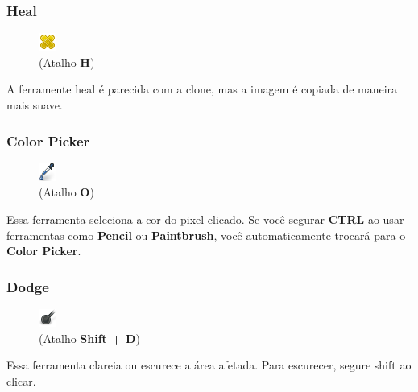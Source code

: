 \documentclass[12pt,onecolumn]{article}
\begin{document}
    \subsubsection{Heal}
      \begin{figure}
        \vspace{-40pt}
        \begin{center}
          \includegraphics{gimp-icons/stock-tool-heal-22.png} \\
          (Atalho {\bf H})
        \end{center}
        \label{fig:heal}
        \vspace{-20pt}
      \end{figure}
      A ferramente heal é parecida com a clone, mas a imagem é copiada de maneira mais suave.

    \subsubsection{Color Picker}
      \begin{figure}
        \vspace{-20pt}
        \begin{center}
          \includegraphics{gimp-icons/stock-tool-color-picker-22.png} \\
          (Atalho {\bf O})
        \end{center}
        \label{fig:color-picker}
        \vspace{-20pt}
      \end{figure}
      Essa ferramenta seleciona a cor do pixel clicado. Se você segurar {\bf
      CTRL} ao usar ferramentas como {\bf Pencil} ou {\bf Paintbrush}, você
      automaticamente trocará para o {\bf Color Picker}.
      
    \clearpage
    \subsubsection{Dodge}
    \begin{figure}
      \vspace{-40pt}
      \begin{center}
        \includegraphics{gimp-icons/stock-tool-dodge-22.png} \\
        (Atalho {\bf Shift + D})
      \end{center}
      \label{fig:dodge}
      \vspace{-20pt}
    \end{figure}
    Essa ferramenta clareia ou escurece a área afetada. Para escurecer, segure shift ao clicar.
    
\end{document}
